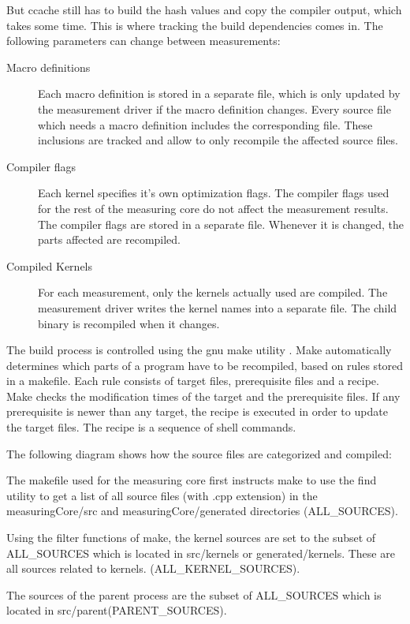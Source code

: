 \documentclass[a4paper,12pt]{article}
\newlength{\imgwidth}
\newcommand{\umlDiagram}[1]{%
	\settowidth{\imgwidth}{\texttt{[image: out/diagrams/\#1.pdf]}}%
	\setlength{\imgwidth}{\minof{0.5\imgwidth}{\textwidth}}%
	\par\vskip0.5cm\noindent\makebox[\textwidth][c]{%
	\texttt{[image: out/diagrams/\#1.pdf]}%
}\vskip0.5cm}
\begin{document}
But ccache still has to build the hash values and copy the compiler output,
which takes some time. This is where tracking the build dependencies comes in.
The following parameters can change between measurements:
\begin{description}
\item[Macro definitions]
Each macro definition is stored in a separate file, which is only updated by the
measurement driver if the macro definition changes. Every source file which
needs a macro definition includes the corresponding file. These inclusions are
tracked and allow to only recompile the affected source files.
\item[Compiler flags] 
Each kernel specifies it's own optimization flags. The compiler flags used for
the rest of the measuring core do not affect the measurement results. The compiler
flags are stored in a separate file. Whenever it is changed, the parts affected
are recompiled.
\item[Compiled Kernels]
For each measurement, only the kernels actually used are compiled. The
measurement driver writes the kernel names into a separate file. The child
binary is recompiled when it changes.
\end{description}

The build process is controlled using the gnu make utility \cite{make}. Make
automatically determines which parts of a program have to be recompiled, based
on rules stored in a makefile. Each rule consists of target files, prerequisite
files and a recipe. Make checks the modification times of the target and the
prerequisite files. If any prerequisite is newer than any target, the recipe is
executed in order to update the target files. The recipe is a sequence of shell
commands.

The following diagram shows how the source files are categorized and compiled:

\umlDiagram{MeasuringCoreBuild}

The makefile used for the measuring core first instructs make to use the find
utility to get a list of all source files (with .cpp extension) in the
measuringCore/src and measuringCore/generated directories (ALL\_SOURCES).

Using the filter functions of make, the kernel sources are set to the subset of
ALL\_SOURCES which is located in src/kernels or generated/kernels. These are all sources related to kernels.
(ALL\_KERNEL\_SOURCES).

The sources of the parent process are the subset of ALL\_SOURCES which is
located in src/parent(PARENT\_SOURCES).
\end{document}
